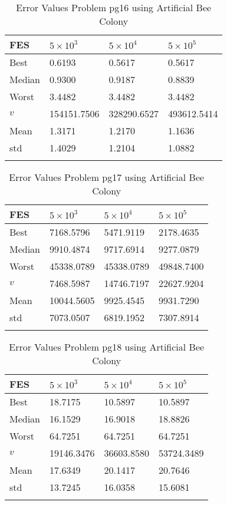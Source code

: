 \documentclass[10pt, a4paper]{book}
\begin{document}
\begin{center}
\begin{longtable}{l l l l}
FES & $5 \times 10^{3}$ & $5 \times 10^{4}$ & $5 \times 10^{5}$ \\
\hline
Best & 0.6193 & 0.5617 & 0.5617 \\
Median & 0.9300 & 0.9187 & 0.8839 \\
Worst & 3.4482 & 3.4482 & 3.4482 \\
$v$ & 154151.7506 & 328290.6527 & 493612.5414 \\
Mean & 1.3171 & 1.2170 & 1.1636 \\
std & 1.4029 & 1.2104 & 1.0882 \\
\caption{ Error Values Problem pg16 using Artificial Bee Colony }
\end{longtable}
\end{center}

\begin{center}
\begin{longtable}{l l l l}
FES & $5 \times 10^{3}$ & $5 \times 10^{4}$ & $5 \times 10^{5}$ \\
\hline
Best & 7168.5796 & 5471.9119 & 2178.4635 \\
Median & 9910.4874 & 9717.6914 & 9277.0879 \\
Worst & 45338.0789 & 45338.0789 & 49848.7400 \\
$v$ & 7468.5987 & 14746.7197 & 22627.9204 \\
Mean & 10044.5605 & 9925.4545 & 9931.7290 \\
std & 7073.0507 & 6819.1952 & 7307.8914 \\
\caption{ Error Values Problem pg17 using Artificial Bee Colony }
\end{longtable}
\end{center}

\begin{center}
\begin{longtable}{l l l l}
FES & $5 \times 10^{3}$ & $5 \times 10^{4}$ & $5 \times 10^{5}$ \\
\hline
Best & 18.7175 & 10.5897 & 10.5897 \\
Median & 16.1529 & 16.9018 & 18.8826 \\
Worst & 64.7251 & 64.7251 & 64.7251 \\
$v$ & 19146.3476 & 36603.8580 & 53724.3489 \\
Mean & 17.6349 & 20.1417 & 20.7646 \\
std & 13.7245 & 16.0358 & 15.6081 \\
\caption{ Error Values Problem pg18 using Artificial Bee Colony }
\end{longtable}
\end{center}
\end{document}

